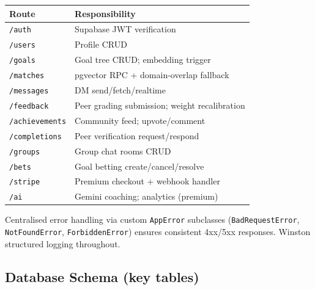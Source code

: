 \documentclass[11pt,a4paper]{article}
\begin{document}
\begin{center}
\begin{tabular}{ll}
\toprule
\textbf{Route} & \textbf{Responsibility} \\
\midrule
\texttt{/auth} & Supabase JWT verification \\
\texttt{/users} & Profile CRUD \\
\texttt{/goals} & Goal tree CRUD; embedding trigger \\
\texttt{/matches} & pgvector RPC + domain-overlap fallback \\
\texttt{/messages} & DM send/fetch/realtime \\
\texttt{/feedback} & Peer grading submission; weight recalibration \\
\texttt{/achievements} & Community feed; upvote/comment \\
\texttt{/completions} & Peer verification request/respond \\
\texttt{/groups} & Group chat rooms CRUD \\
\texttt{/bets} & Goal betting create/cancel/resolve \\
\texttt{/stripe} & Premium checkout + webhook handler \\
\texttt{/ai} & Gemini coaching; analytics (premium) \\
\bottomrule
\end{tabular}
\end{center}

Centralised error handling via custom \texttt{AppError} subclasses (\texttt{BadRequestError}, \texttt{NotFoundError}, \texttt{ForbiddenError}) ensures consistent 4xx/5xx responses. Winston structured logging throughout.

\subsection{Database Schema (key tables)}
\end{document}

